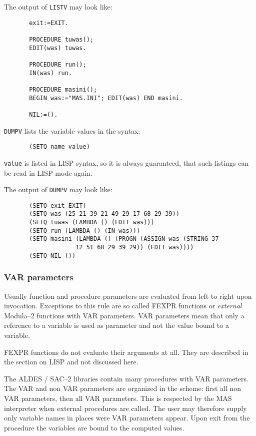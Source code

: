 The output of \verb/LISTV/ may look like:

\begin{verbatim}
       exit:=EXIT.

       PROCEDURE tuwas();
       EDIT(was) tuwas.

       PROCEDURE run();
       IN(was) run.

       PROCEDURE masini();
       BEGIN was:="MAS.INI"; EDIT(was) END masini.

       NIL:=().
\end{verbatim}

{\small
\verb/DUMPV/ lists the variable values in the syntax:
\begin{verbatim}
       (SETQ name value)
\end{verbatim}
\verb/value/ is listed in LISP syntax, so it is 
always guaranteed, that such listings can be read 
in LISP mode again.

The output of \verb/DUMPV/ may look like:

\begin{verbatim}
       (SETQ exit EXIT)
       (SETQ was (25 21 39 21 49 29 17 68 29 39))
       (SETQ tuwas (LAMBDA () (EDIT was)))
       (SETQ run (LAMBDA () (IN was)))
       (SETQ masini (LAMBDA () (PROGN (ASSIGN was (STRING 37
                    12 51 68 29 39 29)) (EDIT was))))
       (SETQ NIL ())
\end{verbatim}
}


\subsubsection{VAR parameters}

Usually function and procedure parameters are evaluated from
left to right upon invocation. 
Exceptions to this rule are 
so called FEXPR functions or 
{\em external} Modula--2 functions with VAR parameters.
VAR parameters mean that only a reference to a variable
is used as parameter and not the value bound to a variable.

FEXPR functions do not evaluate their arguments at all.
They are described in the section on LISP and not discussed 
here.

The ALDES / SAC--2 libraries contain many procedures
with VAR parameters. The VAR and non VAR parameters
are organized in the scheme:
first all non VAR parameters, then all VAR parameters.
This is respected by the MAS interpreter 
when external procedures are called. The user may
therefore supply only variable names in places were 
VAR parameters appear. Upon exit from the procedure
the variables are bound to the computed values.

